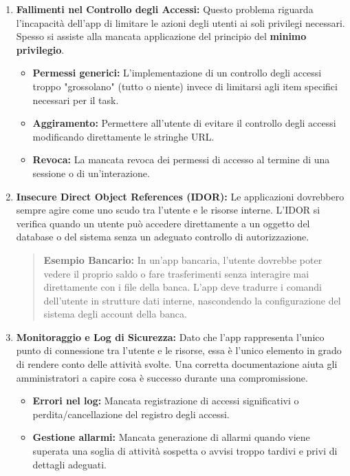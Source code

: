\documentclass{article}
\begin{document}
\begin{enumerate}
    \item \textbf{Fallimenti nel Controllo degli Accessi:} Questo problema riguarda l'incapacità dell'app di limitare le azioni degli utenti ai soli privilegi necessari. Spesso si assiste alla mancata applicazione del principio del \textbf{minimo privilegio}.
    \begin{itemize}
        \item \textbf{Permessi generici:} L'implementazione di un controllo degli accessi troppo "grossolano" (tutto o niente) invece di limitarsi agli item specifici necessari per il task.
        \item \textbf{Aggiramento:} Permettere all'utente di evitare il controllo degli accessi modificando direttamente le stringhe URL.
        \item \textbf{Revoca:} La mancata revoca dei permessi di accesso al termine di una sessione o di un'interazione.
    \end{itemize}

    \item \textbf{Insecure Direct Object References (IDOR):} Le applicazioni dovrebbero sempre agire come uno scudo tra l'utente e le risorse interne. L'IDOR si verifica quando un utente può accedere direttamente a un oggetto del database o del sistema senza un adeguato controllo di autorizzazione.
    \begin{quote}
        \textbf{Esempio Bancario:} In un'app bancaria, l'utente dovrebbe poter vedere il proprio saldo o fare trasferimenti senza interagire mai direttamente con i file della banca. L'app deve tradurre i comandi dell'utente in strutture dati interne, nascondendo la configurazione del sistema degli account della banca.
    \end{quote}

    \item \textbf{Monitoraggio e Log di Sicurezza:} Dato che l'app rappresenta l'unico punto di connessione tra l'utente e le risorse, essa è l'unico elemento in grado di rendere conto delle attività svolte. Una corretta documentazione aiuta gli amministratori a capire cosa è successo durante una compromissione.
    \begin{itemize}
        \item \textbf{Errori nel log:} Mancata registrazione di accessi significativi o perdita/cancellazione del registro degli accessi.
        \item \textbf{Gestione allarmi:} Mancata generazione di allarmi quando viene superata una soglia di attività sospetta o avvisi troppo tardivi e privi di dettagli adeguati.
    \end{itemize}


\end{enumerate}
\end{document}
